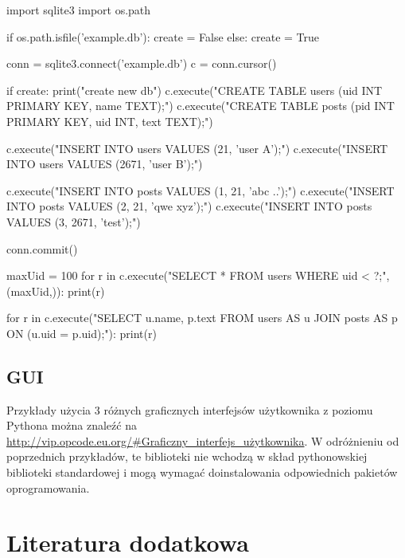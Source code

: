 \documentclass{pdfBooklets}
\begin{document}
\begin{CodeFrame*}[python]{}

import sqlite3
import os.path

if os.path.isfile('example.db'):
	create = False
else:
	create = True

conn = sqlite3.connect('example.db')
c = conn.cursor()

if create:
	print("create new db")
	c.execute("CREATE TABLE users (uid INT PRIMARY KEY, name TEXT);")
	c.execute("CREATE TABLE posts (pid INT PRIMARY KEY, uid INT, text TEXT);")
	
	c.execute("INSERT INTO users VALUES (21, 'user A');")
	c.execute("INSERT INTO users VALUES (2671, 'user B');")
	
	c.execute("INSERT INTO posts VALUES (1, 21, 'abc ..');")
	c.execute("INSERT INTO posts VALUES (2, 21, 'qwe xyz');")
	c.execute("INSERT INTO posts VALUES (3, 2671, 'test');")

	conn.commit()

maxUid = 100
for r in c.execute("SELECT * FROM users WHERE uid < ?;", (maxUid,)):
	print(r)

for r in c.execute("SELECT u.name, p.text FROM users AS u JOIN posts AS p ON (u.uid = p.uid);"):
	print(r)
\end{CodeFrame*}

\subsection{GUI}

Przykłady użycia 3 różnych graficznych interfejsów użytkownika z poziomu Pythona można znaleźć na \url{http://vip.opcode.eu.org/#Graficzny_interfejs_użytkownika}.
W odróżnieniu od poprzednich przykładów, te biblioteki nie wchodzą w skład pythonowskiej biblioteki standardowej i mogą wymagać doinstalowania odpowiednich pakietów oprogramowania.


\student{\vspace{2cm}}
\section{Literatura dodatkowa {\Symbola 🤔}}
\end{document}
